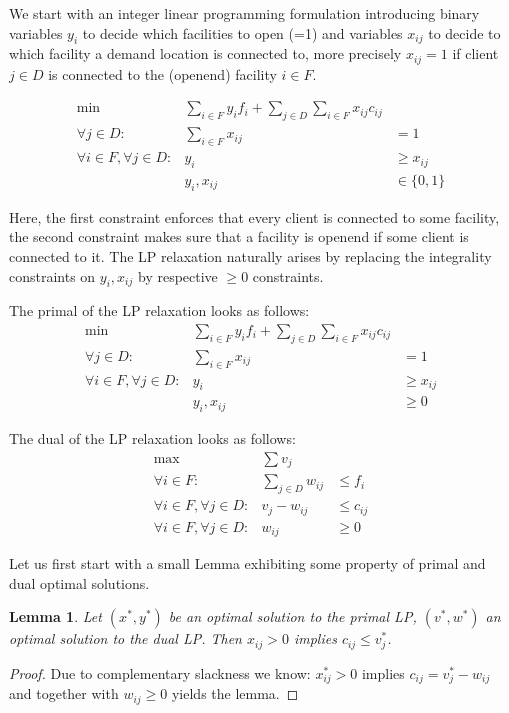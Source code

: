 \documentclass{article}
\newtheorem{lemma}{Lemma}
\begin{document}
We start with an integer linear programming formulation introducing binary variables $y_i$ to decide which facilities to open (=1) and variables $x_{ij}$ to decide to which facility a demand location is connected to, more precisely $x_{ij}=1$ if client $j\in D$ is connected to the (openend) facility $i\in F$.


\begin{eqnarray}\label{UFL}
\mbox{min} & \displaystyle \sum_{i\in F}{y_i f_i} + \sum_{j\in D}{\sum_{i\in F}{x_{ij}c_{ij}}}\\
 \forall j\in D: & \sum_{i\in F} x_{ij}  & = 1 \nonumber\\
 \forall i\in F, \forall j\in D: & y_i &\geq x_{ij} \nonumber\\
 & y_i, x_{ij}&\in \{0,1\} \nonumber
\end{eqnarray}

Here, the first constraint enforces that every client is connected to some facility, the second constraint makes sure that a facility is openend if some client is connected to it. The LP relaxation naturally arises by replacing the integrality constraints on $y_i, x_{ij}$ by respective $\geq 0$ constraints.

The primal of the LP relaxation looks as follows:
\begin{eqnarray}\label{UFLP}
\mbox{min} & \displaystyle \sum_{i\in F}{y_i f_i} + \sum_{j\in D}{\sum_{i\in F}{x_{ij}c_{ij}}}\\
 \forall j\in D: & \sum_{i\in F} x_{ij}  & = 1 \nonumber\\
 \forall i\in F, \forall j\in D: & y_i &\geq x_{ij} \nonumber\\
 & y_i, x_{ij}&\geq 0 \nonumber
\end{eqnarray}

The dual of the LP relaxation looks as follows:
\begin{eqnarray}\label{UFLD}
\mbox{max} & \displaystyle \sum v_j \\
 \forall i\in F: & \sum_{j\in D} w_{ij}  & \leq f_i \nonumber\\
 \forall i\in F, \forall j\in D: & v_j - w_{ij} &\leq c_{ij} \nonumber\\
 \forall i\in F, \forall j\in D: & w_{ij}&\geq 0 \nonumber
\end{eqnarray}

Let us first start with a small Lemma exhibiting some property of primal and dual optimal solutions.

\begin{lemma}
Let $(x^*, y^*)$ be an optimal solution to the primal LP, $(v^*, w^*)$ an optimal solution to the dual LP. Then $x_{ij}>0$ implies $c_{ij}\leq v_j^*$.
\end{lemma}
\begin{proof}
Due to complementary slackness we know: $x^*_{ij}>0$ implies $c_{ij}=v^*_j-w_{ij}$ and together with $w_{ij}\geq 0$ yields the lemma.
\end{proof}
\end{document}
